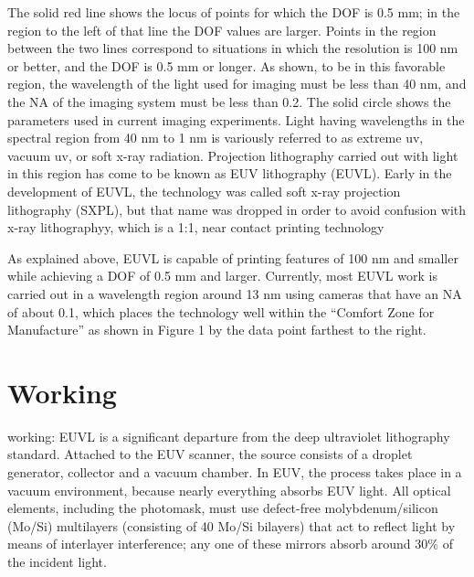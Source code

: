 \documentclass[12pt,a4paper]{report}
\begin{document}
  The solid red line shows the locus of points for which the
DOF is 0.5 mm; in the region to the left of that line the
DOF values are larger. Points in the region between the
two lines correspond to situations in which the resolution
is 100 nm or better, and the DOF is 0.5 mm or longer. As
shown, to be in this favorable region, the wavelength of
the light used for imaging must be less than 40 nm, and
the NA of the imaging system must be less than 0.2. The
solid circle shows the parameters used in current imaging
experiments. Light having wavelengths in the spectral
region from 40 nm to 1 nm is variously referred to as
extreme uv, vacuum uv, or soft x-ray radiation.
Projection lithography carried out with light in this
region has come to be known as EUV lithography
(EUVL). Early in the development of EUVL, the
technology was called soft x-ray projection lithography
(SXPL), but that name was dropped in order to avoid
confusion with x-ray lithographyy, which is a 1:1, 
near contact printing technology


As explained above, EUVL is capable of printing features
of 100 nm and smaller while achieving a DOF of 0.5 mm
and larger. Currently, most EUVL work is carried out in
a wavelength region around 13 nm using cameras that
have an NA of about 0.1, which places the technology
well within the “Comfort Zone for Manufacture” as
shown in Figure 1 by the data point farthest to the right.




\section{Working}

working: 
EUVL is a significant departure from the deep 
ultraviolet lithography standard. 
Attached to the EUV scanner, the source consists 
of a droplet generator, collector and a vacuum chamber. 
In EUV, the process takes place in a vacuum 
environment, because nearly everything absorbs 
EUV light.
{All optical elements, including the photomask,
 must use defect-free molybdenum/silicon (Mo/Si) 
 multilayers (consisting of 40 Mo/Si bilayers) that 
act to reflect light by means of interlayer 
interference; any one of these mirrors absorb
 around 30\% 
of the incident light.
}
\end{document}
